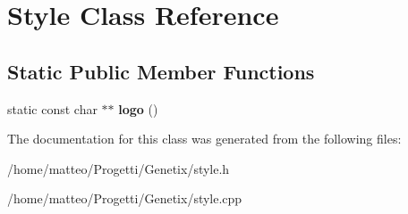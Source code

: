 \hypertarget{classStyle}{}\section{Style Class Reference}
\label{classStyle}
\subsection*{Static Public Member Functions}
\begin{DoxyCompactItemize}
\item 
\mbox{\label{classStyle_a85df87bedbd5eefbad8fb2114f471def}} 
static const char $\ast$$\ast$ {\bfseries logo} ()
\end{DoxyCompactItemize}


The documentation for this class was generated from the following files\+:\begin{DoxyCompactItemize}
\item 
/home/matteo/\+Progetti/\+Genetix/style.\+h\item 
/home/matteo/\+Progetti/\+Genetix/style.\+cpp\end{DoxyCompactItemize}
